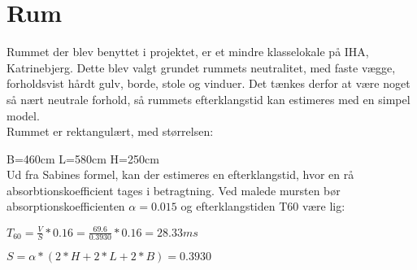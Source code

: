 \section{Rum}

Rummet der blev benyttet i projektet, er et mindre klasselokale på IHA, Katrinebjerg. 
Dette blev valgt grundet rummets neutralitet, med faste vægge, forholdsvist hårdt gulv, borde, stole og vinduer. Det tænkes derfor at være noget så nært neutrale forhold, så rummets efterklangstid kan estimeres med en simpel model. \\

Rummet er rektangulært, med størrelsen:

B=460cm \hspace{3cm}
L=580cm \hspace{3cm}
H=250cm\\

Ud fra Sabines formel, kan der estimeres en efterklangstid, hvor en rå absorbtionskoefficient tages i betragtning. 
Ved malede mursten bør absorptionskoefficienten $\alpha=0.015$ \cite{Attenuation} og efterklangstiden T60 være lig:

\(T_{60}=\frac{V}{S}*0.16=\frac{69.6}{0.3930}*0.16=28.33 ms\)

\(S=\alpha*(2*H+2*L+2*B)=0.3930\)

